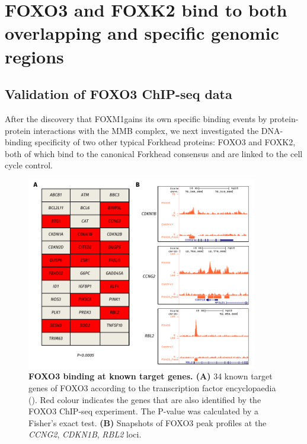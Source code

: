 \section{FOXO3 and FOXK2 bind to both overlapping and specific genomic regions}\label{section:foxo3}

\subsection{Validation of FOXO3 ChIP-seq data}

After the discovery that FOXM1gains its own specific binding events by protein-protein interactions with the MMB complex, we next investigated the DNA-binding specificity of two other typical Forkhead proteins: FOXO3 and FOXK2, both of which bind to the canonical Forkhead consensus and are linked to the cell cycle control.

\begin{figure}[!h]
    \centering
    \includegraphics[width=0.9\textwidth]{chapter3/figures_foxo3/fig39.pdf}
    \caption[FOXO3 binding at known target genes]{\textbf{FOXO3 binding at known target genes. (A)} 34 known target genes of FOXO3 according to the transcription factor encyclopaedia (\cite{yusuf2012the}). Red colour indicates the genes that are also identified by the FOXO3 ChIP-seq experiment. The P-value was calculated by a Fisher's exact test. \textbf{(B)} Snapshots of FOXO3 peak profiles at the \textit{CCNG2}, \textit{CDKN1B}, \textit{RBL2} loci.}
    \label{fig:fig39}
\end{figure}

